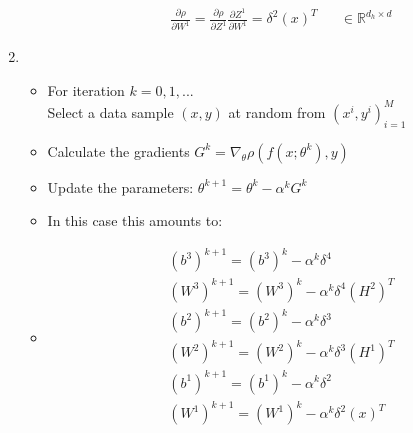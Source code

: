 \documentclass{article}
\begin{document}
\begin{enumerate}[label=(\alph*)]
\begin{enumerate}[label=(\roman*)]
\begin{align*}
			&\frac{\partial \rho}{\partial W^1} = \frac{\partial \rho}{\partial Z^1}\frac{\partial Z^1}{\partial W^1} = \delta^2 \left(x\right)^T && \in \mathbb{R}^{d_h \times d}
		\end{align*}
	\end{enumerate}
	\item 
		\begin{itemize}
			\item For iteration $k = 0, 1, ...$ \\
			Select a data sample $(x, y)$ at random from $\left(x^i, y^i\right)_{i=1}^M$
			\item Calculate the gradients $G^k = \nabla_{\theta}\rho(f(x; \theta^k), y)$
			\item Update the parameters: $\theta^{k+1} = \theta^k - \alpha^kG^k$
			\item In this case this amounts to:
			\item \begin{align*}
					&\left(b^3\right)^{k+1} = \left(b^3\right)^k - \alpha^k\delta^4 \\
					&\left(W^3\right)^{k+1} = \left(W^3\right)^k - \alpha^k\delta^4\left(H^2\right)^T \\
					&\left(b^2\right)^{k+1} = \left(b^2\right)^k - \alpha^k\delta^3 \\
					&\left(W^2\right)^{k+1} = \left(W^2\right)^k - \alpha^k\delta^3\left(H^1\right)^T \\
					&\left(b^1\right)^{k+1} = \left(b^1\right)^k - \alpha^k\delta^2 \\
					&\left(W^1\right)^{k+1} = \left(W^1\right)^k - \alpha^k\delta^2\left(x\right)^T \\
				\end{align*}
		\end{itemize}
\end{enumerate}
\end{document}

